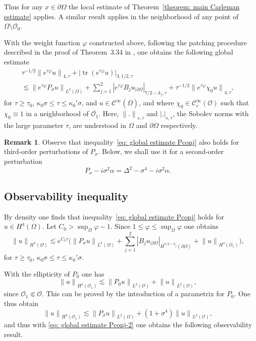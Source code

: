 \documentclass[JEP,XML,SOM,Unicode,published]{cedram}
\theoremstyle{plain}
\theoremstyle{definition}
\newtheorem{remark}[theorem]{Remark}
\newcommand{\nhd}{neighborhood\xspace}
\let\k\kappa
\newcommand{\ovl}[1]{\overline{#1}}
\newcommand{\scrO}{\mathscr O}
\newcommand{\bd}{\ensuremath{_{|\partial\Omega}}}
\newcommand{\Norm}[2]{{\| #1 \|}_{#2}}
\newcommand{\norm}[2]{{|#1|}_{#2}}
\newcommand{\Normsc}[2]{{\| #1 \|}_{#2, \tau}}
\newcommand{\normsc}[2]{{| #1 |}_{#2, \tau}}
\newcommand{\Psig}{P_{\sigma}}
\newcommand{\Con}{\ensuremath{\mathscr C}}
\newcommand{\Cinf}{\ensuremath{\Con^\infty}}
\newcommand{\Cinfc}{\ensuremath{\Con^\infty_c}}
\DeclareMathOperator{\trace}{tr}
\begin{document}
Thus for any $x \in \partial \Omega$ the local estimate of
Theorem~\ref{theorem: main Carleman estimate} applies.
A similar result applies in the \nhd of any point of $\Omega
\setminus \scrO_0$.

With the weight function $\varphi$
constructed above, following the patching procedure described in the proof of Theorem~3.34 in
\cite{JGL-vol1}, one obtains the following global estimate
\begin{multline}\label{eq: global estimate Pconj}
\tau^{-1/2} \Normsc{e^{\tau \varphi} u}{4}
+ \normsc{ \trace(e^{\tau \varphi} u)}{3,1/2}\\
\lesssim
\Norm{e^{\tau \varphi} \Psig u}{L^2(\Omega)}
+ \sum_{j=1}^{2} \normsc{e^{\tau \varphi} B_{j}u\bd}{7/2-k_{j}}
+ \tau^{-1/2} \Normsc{e^{\tau \varphi} \chi_0 u}{4},
\end{multline}
for $\tau\geq \tau_0$,
$\k_0 \sigma \leq \tau \leq \k_0' \sigma $, and $u\in
\Cinf(\ovl{\Omega})$, and where $\chi_0 \in \Cinfc(\scrO)$ such that
$\chi_0 \equiv 1$ in a \nhd of $\ovl{\scrO_1}$.
Here, $\Normsc{.}{s}$ and $\normsc{.}{s}$, the Sobolev norms with the large parameter $\tau$,
are understood
in $\Omega$ and $\partial\Omega$ respectively.

\begin{remark}
\label{remark: global estimate third-order perturbation}
Observe that inequality~\eqref{eq: global estimate Pconj} also holds
for third-order perturbations of $\Psig$. Below, we shall use it for
a second-order perturbation
\[
\Psig-i \sigma^2 \alpha = \Delta^2 -\sigma^4 -i \sigma^2 \alpha .
\]
\end{remark}

\subsection{Observability inequality}

By density one finds that inequality~\ref{eq: global estimate Pconj}
holds for $u \in H^4(\Omega)$.
Let $ C_0 > \sup_{\ovl{\Omega}}\varphi-1$. Since $1 \leq \varphi
\leq \sup_{\ovl{\Omega}}\varphi$ one obtains
\begin{equation}\label{eq: global estimate Pconj-2}
\Norm{u}{H^4(\Omega)}
\lesssim
e^{C_0 \tau} \big(\Norm{\Psig u}{L^2(\Omega)}
+ \sum_{j=1}^{2} \norm{ B_{j}u\bd}{H^{7/2-k_j}(\partial \Omega)}
+ \Norm{u}{H^4(\scrO_1)}
\big),
\end{equation}
for $\tau\geq \tau_0$,
$\k_0 \sigma \leq \tau \leq \k_0' \sigma $.

With the ellipticity of $P_0$ one has
\begin{equation*}
\Norm{u}{H^4(\scrO_1)}
\lesssim \Norm{P_0 u}{L^2(\scrO)}
+ \Norm{u}{L^2(\scrO)},
\end{equation*}
since $\scrO_1 \Subset \scrO$. This can be proved by the introduction
of a parametrix for $P_0$.
One thus obtain
\begin{equation*}
\Norm{u}{H^4(\scrO_1)}
\lesssim \Norm{\Psig u}{L^2(\Omega)}
+ (1+ \sigma^4) \Norm{u}{L^2(\scrO)},
\end{equation*}
and thus with \eqref{eq: global estimate Pconj-2} one obtains the
following observability result.
\end{document}
